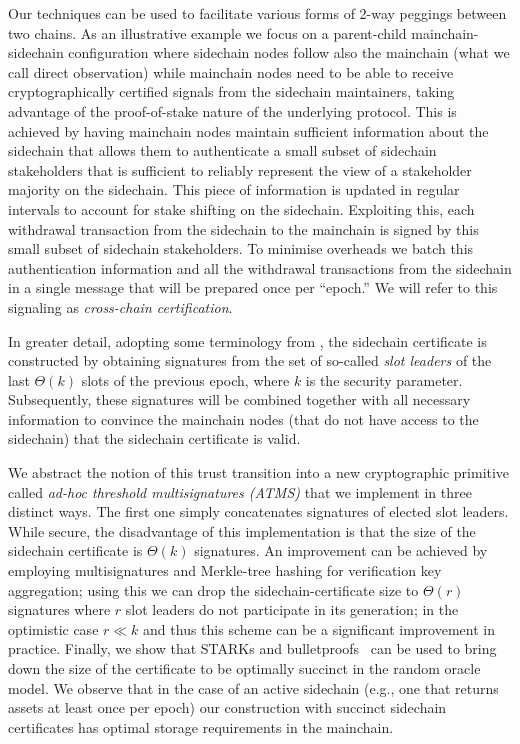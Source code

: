 Our techniques can be used to facilitate various forms of 2-way peggings
between two chains. As an illustrative example we focus on a parent-child
mainchain-sidechain
configuration where sidechain nodes follow also the mainchain (what we call direct observation) while mainchain nodes need to be able to receive cryptographically
certified signals
from the sidechain maintainers,
taking advantage of the proof-of-stake nature of the underlying protocol. This is achieved by having
mainchain nodes maintain sufficient information about the sidechain that allows
them to authenticate a
small subset of  sidechain stakeholders that is sufficient to
reliably represent the view of a stakeholder majority on the sidechain.
This piece of information is updated in regular intervals to account
for  stake shifting on the sidechain.
Exploiting this, each withdrawal  transaction from the sidechain to the mainchain
is signed by this  small subset of sidechain stakeholders.
To minimise overheads we batch this authentication information and all the withdrawal transactions from
the sidechain in a single message that will be prepared once per ``epoch.'' We will
refer to this signaling  as
 {\em cross-chain certification}.

In greater detail, adopting some terminology  from \cite{C:KRDO17},
the sidechain certificate  is constructed by obtaining
signatures  from the set of so-called \emph{slot leaders} of the last
$\Theta(k)$ slots of the previous epoch, where $k$ is the security parameter.
Subsequently, these signatures will be combined together with all necessary
information to convince the mainchain nodes (that do not have access to the
sidechain) that the sidechain certificate is valid.

We abstract the notion of
this trust transition into a new cryptographic primitive called
\emph{ad-hoc threshold multisignatures (ATMS)}
that we implement in three distinct ways. The first one
simply concatenates signatures of elected slot leaders. While secure, the disadvantage of
this implementation is that the size of the sidechain certificate is
$\Theta(k)$ signatures.
An improvement can be achieved by
employing multisignatures and Merkle-tree hashing for verification key aggregation;  using this we can drop the sidechain-certificate size to
$\Theta(r)$ signatures where $r$  slot leaders do not participate in its generation; in the optimistic case $r\ll k$ and thus this scheme can be
a significant improvement in practice. Finally, we show that STARKs and bulletproofs~\cite{ben2017scalable,bunzbulletproofs}
can be used to bring down the size of the certificate to be optimally succinct in the random oracle model.  We observe that in the case of an active sidechain (e.g., one that returns assets
at least once per epoch) our construction with succinct sidechain
certificates has optimal storage requirements in the mainchain.


